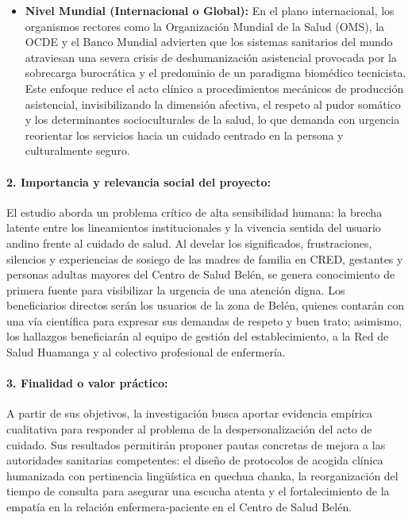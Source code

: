 \begin{itemize}
    \item \textbf{Nivel Mundial (Internacional o Global):} En el plano internacional, los organismos rectores como la Organización Mundial de la Salud (OMS), la OCDE y el Banco Mundial \cite{who2018} advierten que los sistemas sanitarios del mundo atraviesan una severa crisis de deshumanización asistencial provocada por la sobrecarga burocrática y el predominio de un paradigma biomédico tecnicista. Este enfoque reduce el acto clínico a procedimientos mecánicos de producción asistencial, invisibilizando la dimensión afectiva, el respeto al pudor somático y los determinantes socioculturales de la salud, lo que demanda con urgencia reorientar los servicios hacia un cuidado centrado en la persona y culturalmente seguro.
\end{itemize}

\paragraph{2. Importancia y relevancia social del proyecto:}
El estudio aborda un problema crítico de alta sensibilidad humana: la brecha latente entre los lineamientos institucionales y la vivencia sentida del usuario andino frente al cuidado de salud. Al develar los significados, frustraciones, silencios y experiencias de sosiego de las madres de familia en CRED, gestantes y personas adultas mayores del Centro de Salud Belén, se genera conocimiento de primera fuente para visibilizar la urgencia de una atención digna. Los beneficiarios directos serán los usuarios de la zona de Belén, quienes contarán con una vía científica para expresar sus demandas de respeto y buen trato; asimismo, los hallazgos beneficiarán al equipo de gestión del establecimiento, a la Red de Salud Huamanga y al colectivo profesional de enfermería.

\paragraph{3. Finalidad o valor práctico:}
A partir de sus objetivos, la investigación busca aportar evidencia empírica cualitativa para responder al problema de la despersonalización del acto de cuidado. Sus resultados permitirán proponer pautas concretas de mejora a las autoridades sanitarias competentes: el diseño de protocolos de acogida clínica humanizada con pertinencia lingüística en quechua chanka, la reorganización del tiempo de consulta para asegurar una escucha atenta y el fortalecimiento de la empatía en la relación enfermera-paciente en el Centro de Salud Belén.

